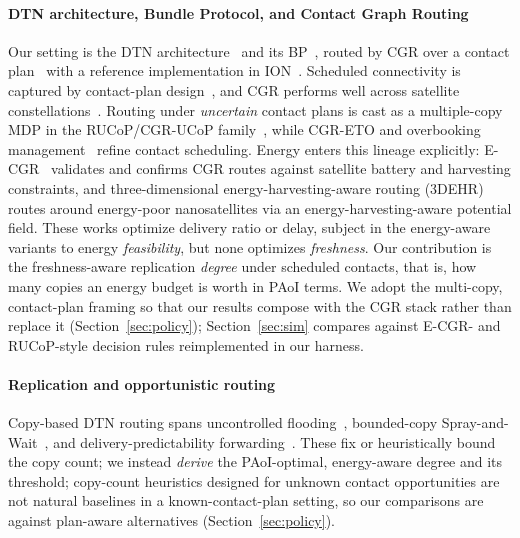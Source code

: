 \documentclass[twocolumn,3p,times,procedia]{elsarticle}
\theoremstyle{plain}
\theoremstyle{remark}
\begin{document}
\paragraph*{DTN architecture, Bundle Protocol, and Contact Graph Routing}
Our setting is the DTN architecture~\cite{fall2003,rfc4838} and its
BP~\cite{rfc5050,rfc9171}, routed by CGR over a
contact plan~\cite{araniti2015} with a reference implementation in
ION~\cite{burleigh2007ion}. Scheduled connectivity is captured by
contact-plan design~\cite{fraire2015cpd,madoery2016}, and CGR performs well
across satellite constellations~\cite{fraire2017}. Routing under
\emph{uncertain} contact plans is cast as a multiple-copy MDP in the
RUCoP/CGR-UCoP family~\cite{rucop}, while CGR-ETO and overbooking
management~\cite{bezirgiannidis} refine contact scheduling. Energy
enters this lineage explicitly: E-CGR~\cite{ecgr} validates and confirms
CGR routes against satellite battery and harvesting constraints, and
three-dimensional energy-harvesting-aware routing
(3DEHR)~\cite{wang3dehr} routes around energy-poor nanosatellites via
an energy-harvesting-aware potential field. These works optimize delivery
ratio or delay, subject in the energy-aware variants to energy
\emph{feasibility}, but none optimizes \emph{freshness}. Our
contribution is the freshness-aware replication \emph{degree} under
scheduled contacts, that is, how many copies an energy budget is worth
in PAoI terms. We adopt the multi-copy, contact-plan framing so that our
results compose with the CGR stack rather than replace it
(Section~\ref{sec:policy}); Section~\ref{sec:sim} compares against
E-CGR- and RUCoP-style decision rules reimplemented in our harness.

\paragraph*{Replication and opportunistic routing}
Copy-based DTN routing spans uncontrolled flooding~\cite{vahdat2000},
bounded-copy Spray-and-Wait~\cite{spyropoulos2005}, and
delivery-predictability forwarding~\cite{lindgren2003}. These fix or
heuristically bound the copy count; we instead \emph{derive} the
PAoI-optimal, energy-aware degree and its threshold; copy-count
heuristics designed for unknown contact opportunities are not natural
baselines in a known-contact-plan setting, so our comparisons are
against plan-aware alternatives (Section~\ref{sec:policy}).
\end{document}
